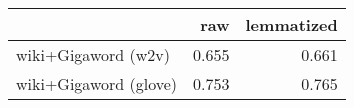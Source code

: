 \begin{tabular}{lrr}
\toprule
{} &    raw &  lemmatized \\
\midrule
wiki+Gigaword (w2v)   &  0.655 &       0.661 \\
wiki+Gigaword (glove) &  0.753 &       0.765 \\
\bottomrule
\end{tabular}
